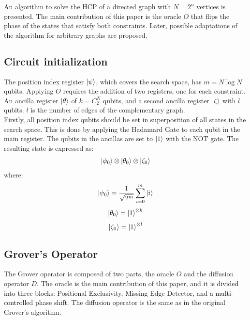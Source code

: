 \documentclass[10pt,a4paper]{article}
\begin{document}
An algorithm to solve the HCP of a directed graph with $N = 2^n$ vertices is presented. The main contribution of this paper is the oracle $O$ that flips the phase of the states that satisfy both constraints. Later, possible adaptations of the algorithm for arbitrary graphs are proposed.

\subsection{Circuit initialization}
The position index register $\ket{\psi}$, which covers the search space, has $m = N\log N$ qubits. Applying $O$ requires the addition of two registers, one for each constraint. An ancilla register $\ket{\theta}$ of $k = C^N_2$ qubits, and a second ancilla register $\ket{\zeta}$ with $l$ qubits. $l$ is the number of edges of the  complementary graph.\\
Firstly, all position index qubits should be set in superposition of all states in the search space. This is done by applying the Hadamard Gate to each qubit in the main register. The qubits in the ancillas are set to $\ket{1}$ with the NOT gate. The resulting state is expressed as:
$$\ket{\psi_0} \otimes \ket{\theta_0} \otimes \ket{\zeta_0}$$
where:
$$\ket{\psi_0} = \frac{1}{\sqrt{2^m}}\sum_{i=0}^{m} \ket{i}$$
$$\ket{\theta_0} = \ket{1}^{\otimes k}$$
$$\ket{\zeta_0} = \ket{1}^{\otimes l}$$

\subsection{Grover's Operator}
The Grover operator is composed of two parts, the oracle $O$ and the diffusion operator $D$. The oracle is the main contribution of this paper, and it is divided into three blocks: Positional Exclusivity, Missing Edge Detector, and a multi-controlled phase shift. The diffusion operator is the same as in the original Grover's algorithm.
\end{document}
